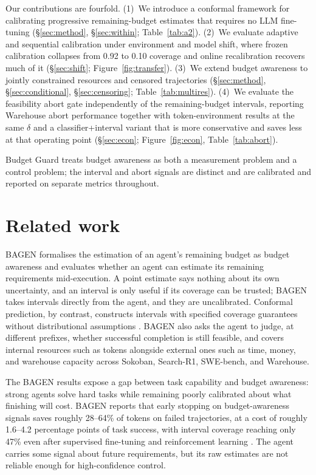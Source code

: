 \documentclass{article}
\newcommand{\bg}{Budget Guard}
\begin{document}
Our contributions are fourfold. (1)~We introduce a conformal framework for calibrating
progressive remaining-budget estimates that requires no LLM fine-tuning
(\S\ref{sec:method}, \S\ref{sec:within}; Table~\ref{tab:a2}). (2)~We evaluate adaptive
and sequential calibration under environment and model shift, where frozen calibration
collapses from 0.92 to 0.10 coverage and online recalibration recovers much of it
(\S\ref{sec:shift}; Figure~\ref{fig:transfer}). (3)~We extend budget awareness to
jointly constrained resources and censored trajectories (\S\ref{sec:method},
\S\ref{sec:conditional}, \S\ref{sec:censoring}; Table~\ref{tab:multires}). (4)~We
evaluate the feasibility abort gate independently of the remaining-budget intervals,
reporting Warehouse abort performance together with token-environment results at the
same $\delta$ and a classifier+interval variant that is more conservative and saves
less at that operating point (\S\ref{sec:econ}; Figure~\ref{fig:econ},
Table~\ref{tab:abort}).

\bg{} treats budget awareness as both a measurement problem and a control problem; the
interval and abort signals are distinct and are calibrated and reported on separate
metrics throughout.

\section{Related work}
\label{sec:related}

BAGEN \cite{lin2026bagen} formalises the estimation of an agent's remaining budget as
budget awareness and evaluates whether an agent can estimate its remaining requirements
mid-execution. A point estimate says nothing about its own uncertainty, and an interval
is only useful if its coverage can be trusted; BAGEN takes intervals directly from the
agent, and they are uncalibrated. Conformal prediction, by contrast, constructs
intervals with specified coverage guarantees without distributional assumptions
\cite{angelopoulos2023gentle,lei2018distribution}. BAGEN also asks the agent to judge,
at different prefixes, whether successful completion is still feasible, and covers
internal resources such as tokens alongside external ones such as time, money, and
warehouse capacity across Sokoban, Search-R1, SWE-bench, and Warehouse.

The BAGEN results expose a gap between task capability and budget awareness: strong
agents solve hard tasks while remaining poorly calibrated about what finishing will
cost. BAGEN reports that early stopping on budget-awareness signals saves roughly
28--64\% of tokens on failed trajectories, at a cost of roughly 1.6--4.2 percentage
points of task success, with interval coverage reaching only 47\% even after supervised
fine-tuning and reinforcement learning \cite{lin2026bagen}. The agent carries some
signal about future requirements, but its raw estimates are not reliable enough for
high-confidence control.
\end{document}
